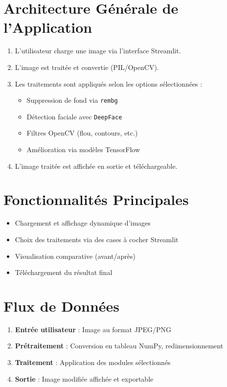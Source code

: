 \documentclass[a4paper,12pt]{article}
\begin{document}
\section*{Architecture Générale de l'Application}
\begin{enumerate}
  \item L’utilisateur charge une image via l’interface Streamlit.
  \item L’image est traitée et convertie (PIL/OpenCV).
  \item Les traitements sont appliqués selon les options sélectionnées :
  \begin{itemize}
    \item Suppression de fond via \texttt{rembg}
    \item Détection faciale avec \texttt{DeepFace}
    \item Filtres OpenCV (flou, contours, etc.)
    \item Amélioration via modèles TensorFlow
  \end{itemize}
  \item L’image traitée est affichée en sortie et téléchargeable.
\end{enumerate}

\section*{Fonctionnalités Principales}
\begin{itemize}
  \item Chargement et affichage dynamique d’images
  \item Choix des traitements via des cases à cocher Streamlit
  \item Visualisation comparative (avant/après)
  \item Téléchargement du résultat final
\end{itemize}

\section*{Flux de Données}
\begin{enumerate}
  \item \textbf{Entrée utilisateur} : Image au format JPEG/PNG
  \item \textbf{Prétraitement} : Conversion en tableau NumPy, redimensionnement
  \item \textbf{Traitement} : Application des modules sélectionnés
  \item \textbf{Sortie} : Image modifiée affichée et exportable
\end{enumerate}
\end{document}
